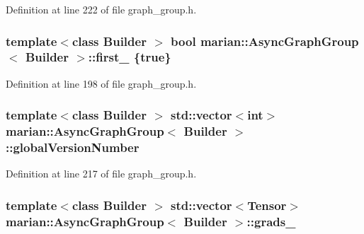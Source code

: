 Definition at line 222 of file graph\+\_\+group.\+h.

\subsubsection[{\texorpdfstring{first\+\_\+}{first_}}]{\setlength{\rightskip}{0pt plus 5cm}template$<$class Builder $>$ bool {\bf marian\+::\+Async\+Graph\+Group}$<$ Builder $>$\+::first\+\_\+ \{true\}\hspace{0.3cm}{\ttfamily [private]}}\hypertarget{classmarian_1_1AsyncGraphGroup_af89976e48b8e21119bbf66ea7bc23d96}{}\label{classmarian_1_1AsyncGraphGroup_af89976e48b8e21119bbf66ea7bc23d96}


Definition at line 198 of file graph\+\_\+group.\+h.

\subsubsection[{\texorpdfstring{global\+Version\+Number}{globalVersionNumber}}]{\setlength{\rightskip}{0pt plus 5cm}template$<$class Builder $>$ std\+::vector$<$int$>$ {\bf marian\+::\+Async\+Graph\+Group}$<$ Builder $>$\+::global\+Version\+Number\hspace{0.3cm}{\ttfamily [private]}}\hypertarget{classmarian_1_1AsyncGraphGroup_a75884703e6fe8efb3c75293eb912bce4}{}\label{classmarian_1_1AsyncGraphGroup_a75884703e6fe8efb3c75293eb912bce4}


Definition at line 217 of file graph\+\_\+group.\+h.

\subsubsection[{\texorpdfstring{grads\+\_\+}{grads_}}]{\setlength{\rightskip}{0pt plus 5cm}template$<$class Builder $>$ std\+::vector$<${\bf Tensor}$>$ {\bf marian\+::\+Async\+Graph\+Group}$<$ Builder $>$\+::grads\+\_\+\hspace{0.3cm}{\ttfamily [private]}}\hypertarget{classmarian_1_1AsyncGraphGroup_ad2f8bc6900976be4426acc4631d07145}{}\label{classmarian_1_1AsyncGraphGroup_ad2f8bc6900976be4426acc4631d07145}



